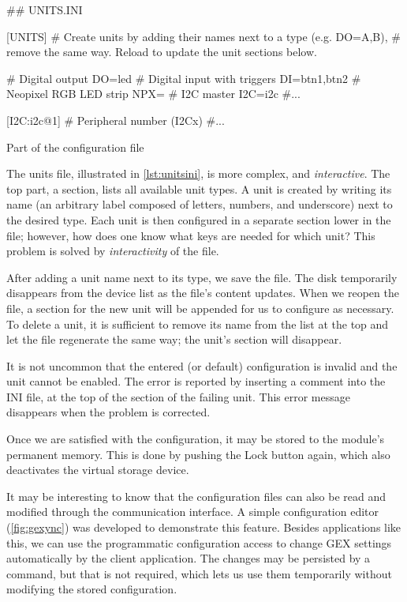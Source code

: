 \begin{listing}
	\begin{inicode}
		## UNITS.INI
		
		[UNITS]
		# Create units by adding their names next to a type (e.g. DO=A,B),
		# remove the same way. Reload to update the unit sections below.
		
		# Digital output
		DO=led
		# Digital input with triggers
		DI=btn1,btn2
		# Neopixel RGB LED strip
		NPX=
		# I2C master
		I2C=i2c
		#...
		
		[I2C:i2c@1]
		# Peripheral number (I2Cx)
		#...
	\end{inicode}
	\caption{\label{lst:unitsini}Part of the  configuration file}
\end{listing}

The units file, illustrated in \cref{lst:unitsini}, is more complex, and \textit{interactive}. The top part, a \mono{[UNITS]} section, lists all available unit types. A unit is created by writing its name (an arbitrary label composed of letters, numbers, and underscore) next to the desired type. Each unit is then configured in a separate section lower in the file; however, how does one know what keys are needed for which unit? This problem is solved by \textit{interactivity} of the file.

After adding a unit name next to its type, we save the file. The disk temporarily disappears from the device list as the file's content updates. When we reopen the file, a section for the new unit will be appended for us to configure as necessary. To delete a unit, it is sufficient to remove its name from the list at the top and let the file regenerate the same way; the unit's section will disappear.

It is not uncommon that the entered (or default) configuration is invalid and the unit cannot be enabled. The error is reported by inserting a comment into the INI file, at the top of the section of the failing unit. This error message disappears when the problem is corrected.

Once we are satisfied with the configuration, it may be stored to the module's permanent memory. This is done by pushing the Lock button again, which also deactivates the virtual storage device.

It may be interesting to know that the configuration files can also be read and modified through the communication interface. A simple configuration editor (\cref{fig:gexync}) was developed to demonstrate this feature. Besides applications like this, we can use the programmatic configuration access to change GEX settings automatically by the client application. The changes may be persisted by a command, but that is not required, which lets us use them temporarily without modifying the stored configuration.


